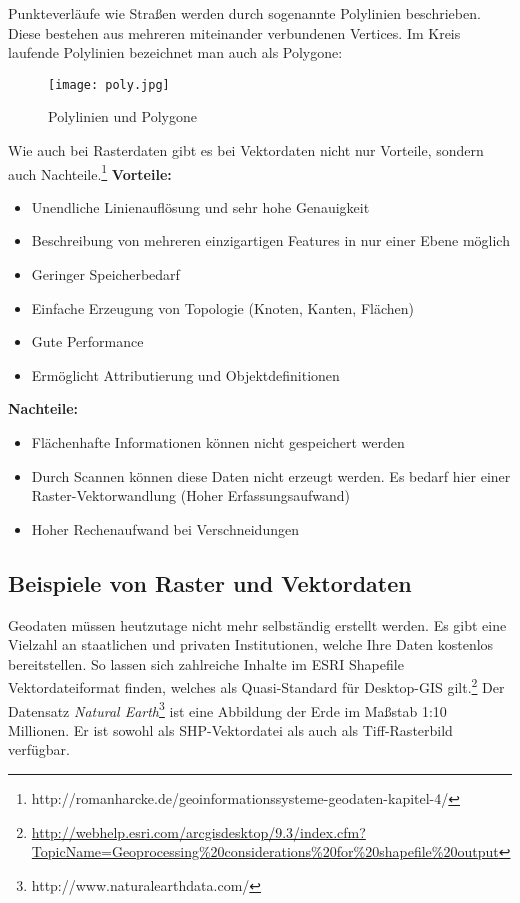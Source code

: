 \documentclass[11pt,ceqn]{book}
\begin{document}

Punkteverläufe wie Straßen werden durch sogenannte Polylinien beschrieben. Diese bestehen aus mehreren miteinander verbundenen Vertices. Im Kreis laufende Polylinien bezeichnet man auch als Polygone:

\begin{figure}[H]
\centering
\texttt{[image: poly.jpg]}
\caption{Polylinien und Polygone \protect\footnotemark}
\end{figure}


Wie auch bei Rasterdaten gibt es bei Vektordaten nicht nur Vorteile, sondern auch Nachteile.\footnote{http://romanharcke.de/geoinformationssysteme-geodaten-kapitel-4/}\newline
\textbf{Vorteile:}
\begin{itemize}
\item Unendliche Linienauflösung und sehr hohe Genauigkeit
\item Beschreibung von mehreren einzigartigen Features in nur einer Ebene möglich
\item Geringer Speicherbedarf
\item Einfache Erzeugung von Topologie (Knoten, Kanten, Flächen)
\item Gute Performance
\item Ermöglicht Attributierung und Objektdefinitionen
\end{itemize}
\textbf{Nachteile:}
\begin{itemize}
\item Flächenhafte Informationen können nicht gespeichert werden 
\item Durch Scannen können diese Daten nicht erzeugt werden. Es bedarf hier einer Raster-Vektorwandlung (Hoher Erfassungsaufwand)
\item Hoher Rechenaufwand bei Verschneidungen
\end{itemize}

\subsection{Beispiele von Raster und Vektordaten}
Geodaten müssen heutzutage nicht mehr selbständig erstellt werden. Es gibt eine Vielzahl an staatlichen und privaten Institutionen, welche Ihre Daten kostenlos bereitstellen. So lassen sich zahlreiche Inhalte im ESRI Shapefile Vektordateiformat finden, welches als Quasi-Standard für Desktop-GIS gilt.\footnote{\url{http://webhelp.esri.com/arcgisdesktop/9.3/index.cfm?TopicName=Geoprocessing\%20considerations\%20for\%20shapefile\%20output}}
Der Datensatz \textit{Natural Earth}\footnote{http://www.naturalearthdata.com/} ist eine Abbildung der Erde im Maßstab 1:10 Millionen. Er ist sowohl als SHP-Vektordatei als auch als Tiff-Rasterbild verfügbar.
\end{document}
